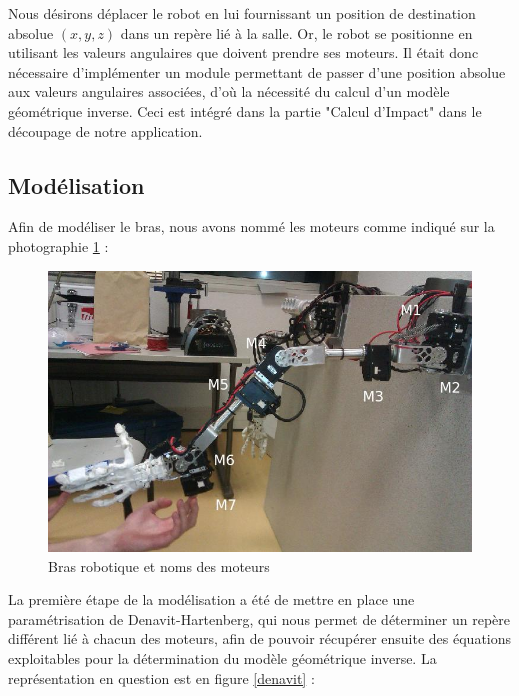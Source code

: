 
Nous désirons déplacer le robot en lui fournissant un position de destination absolue $(x, y, z)$ dans un repère lié à la salle. Or, le robot se positionne en utilisant les valeurs angulaires que doivent prendre ses moteurs. Il était donc nécessaire d'implémenter un module permettant de passer d'une position absolue aux valeurs angulaires associées, d'où la nécessité du calcul d'un modèle géométrique inverse. Ceci est intégré dans la partie "Calcul d'Impact" dans le découpage de notre application.

\subsection{Modélisation}

Afin de modéliser le bras, nous avons nommé les moteurs comme indiqué sur la photographie \ref{moteurs} :\\

\begin{figure}[!htc]
	\begin{center}
		\includegraphics[scale=0.6]{images/robot1.jpg}
		\caption{Bras robotique et noms des moteurs} 
		\label{moteurs}
	\end{center}
\end{figure}

La première étape de la modélisation a été de mettre en place une paramétrisation de Denavit-Hartenberg, qui nous permet de déterminer un repère différent lié à chacun des moteurs, afin de pouvoir récupérer ensuite des équations exploitables pour la détermination du modèle géométrique inverse.
\newpage
La représentation en question est en figure \ref{denavit} :\\

